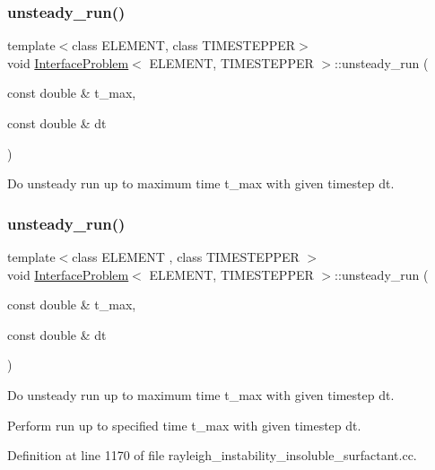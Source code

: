 \subsubsection{\texorpdfstring{unsteady\+\_\+run()}{unsteady\_run()}\hspace{0.1cm}{\footnotesize\ttfamily [2/3]}}
{\footnotesize\ttfamily template$<$class E\+L\+E\+M\+E\+NT, class T\+I\+M\+E\+S\+T\+E\+P\+P\+ER$>$ \\
void \hyperlink{classInterfaceProblem}{Interface\+Problem}$<$ E\+L\+E\+M\+E\+NT, T\+I\+M\+E\+S\+T\+E\+P\+P\+ER $>$\+::unsteady\+\_\+run (\begin{DoxyParamCaption}\item[{const double \&}]{t\+\_\+max,  }\item[{const double \&}]{dt }\end{DoxyParamCaption})}



Do unsteady run up to maximum time t\+\_\+max with given timestep dt. 

\mbox{\label{classInterfaceProblem_adf1f4e43d10939e4323e0e315b711085}} 
\subsubsection{\texorpdfstring{unsteady\+\_\+run()}{unsteady\_run()}\hspace{0.1cm}{\footnotesize\ttfamily [3/3]}}
{\footnotesize\ttfamily template$<$class E\+L\+E\+M\+E\+NT , class T\+I\+M\+E\+S\+T\+E\+P\+P\+ER $>$ \\
void \hyperlink{classInterfaceProblem}{Interface\+Problem}$<$ E\+L\+E\+M\+E\+NT, T\+I\+M\+E\+S\+T\+E\+P\+P\+ER $>$\+::unsteady\+\_\+run (\begin{DoxyParamCaption}\item[{const double \&}]{t\+\_\+max,  }\item[{const double \&}]{dt }\end{DoxyParamCaption})}



Do unsteady run up to maximum time t\+\_\+max with given timestep dt. 

Perform run up to specified time t\+\_\+max with given timestep dt. 

Definition at line 1170 of file rayleigh\+\_\+instability\+\_\+insoluble\+\_\+surfactant.\+cc.



